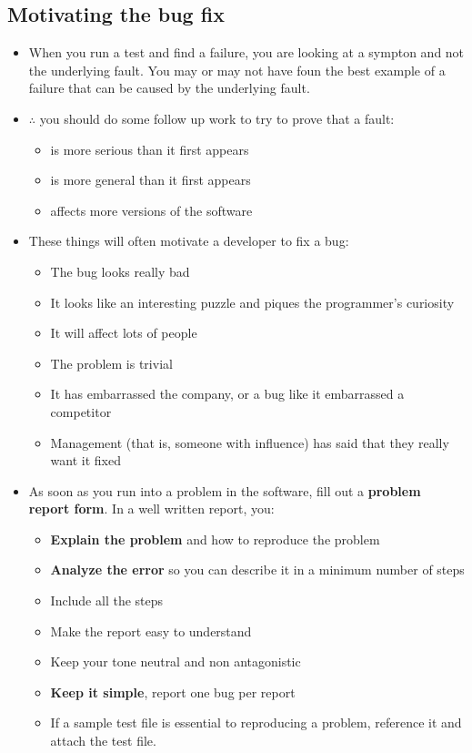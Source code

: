 \documentclass[12pt]{book}
\begin{document}
\subsection*{Motivating the bug fix}

\begin{itemize}
    \item When you run a test and find a failure, you are looking at a sympton and not the underlying fault. You may or may not have foun the best example of a failure that can be caused by the underlying fault.
    
    \item $\therefore$ you should do some follow up work to try to prove that a fault:
    \begin{itemize}
        \item is more serious than it first appears
        \item is more general than it first appears
        \item affects more versions of the software
    \end{itemize} 

    \item These things will often motivate a developer to fix a bug:
    \begin{itemize}
        \item The bug looks really bad
        \item It looks like an interesting puzzle and piques the programmer's curiosity
        \item It will affect lots of people
        \item The problem is trivial
        \item It has embarrassed the company, or a bug like it embarrassed a competitor
        \item Management (that is, someone with influence) has said that they really want it fixed
    \end{itemize} 

    \item As soon as you run into a problem in the software, fill out a \textbf{problem report form}. In a well written report, you:
    \begin{itemize}
        \item \textbf{Explain the problem} and how to reproduce the problem
        \item \textbf{Analyze the error} so you can describe it in a minimum number of steps
        \item Include all the steps
        \item Make the report easy to understand
        \item Keep your tone neutral and non antagonistic
        \item \textbf{Keep it simple}, report one bug per report
        \item If a sample test file is essential to reproducing a problem, reference it and attach the test file.
    \end{itemize} 
\end{itemize}
\end{document}
